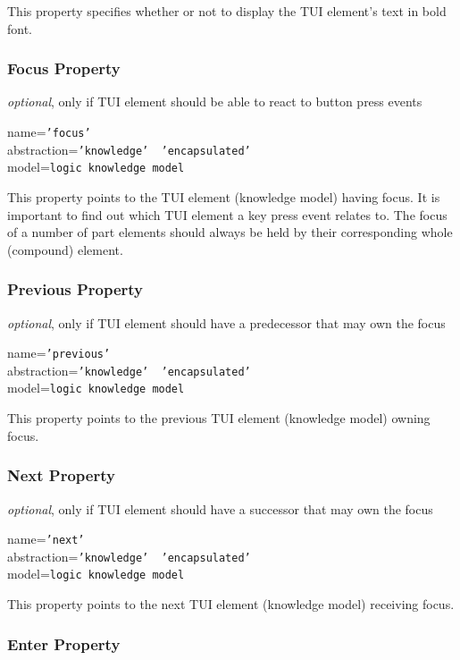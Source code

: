 This property specifies whether or not to display the TUI element's text in
bold font.

\subsubsection{Focus Property}

\emph{optional}, only if TUI element should be able to react to button press events

name=\texttt{'focus'}\\
abstraction=\texttt{'knowledge' \vline\ 'encapsulated'}\\
model=\texttt{logic knowledge model}

This property points to the TUI element (knowledge model) having focus. It is
important to find out which TUI element a key press event relates to. The focus
of a number of part elements should always be held by their corresponding
whole (compound) element.

\subsubsection{Previous Property}

\emph{optional}, only if TUI element should have a predecessor that may own the focus

name=\texttt{'previous'}\\
abstraction=\texttt{'knowledge' \vline\ 'encapsulated'}\\
model=\texttt{logic knowledge model}

This property points to the previous TUI element (knowledge model) owning focus.

\subsubsection{Next Property}

\emph{optional}, only if TUI element should have a successor that may own the focus

name=\texttt{'next'}\\
abstraction=\texttt{'knowledge' \vline\ 'encapsulated'}\\
model=\texttt{logic knowledge model}

This property points to the next TUI element (knowledge model) receiving focus.

\subsubsection{Enter Property}

